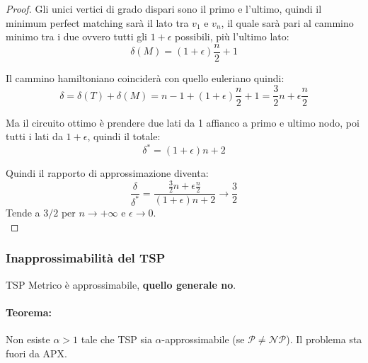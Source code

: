 \begin{proof}
	Gli unici vertici di grado dispari sono il primo e l'ultimo, quindi il minimum perfect matching sarà il lato tra $v_1$ e $v_n$, il quale sarà pari al cammino minimo tra i due ovvero tutti gli $1 + \epsilon$ possibili, più l'ultimo lato:
	$$ \delta(M) = (1 + \epsilon) \frac{n}{2} + 1$$
	
	Il cammino hamiltoniano coinciderà con quello euleriano quindi:
	$$ \delta = \delta (T) + \delta (M) = n-1 + (1 + \epsilon) \frac{n}{2} + 1 = \frac{3}{2} n + \epsilon \frac{n}{2} $$
	
	Ma il circuito ottimo è prendere due lati da 1 affianco a primo e ultimo nodo, poi tutti i lati da $1 + \epsilon$, quindi il totale: 
	$$ \delta^\ast = (1+ \epsilon)n + 2 $$
	
	Quindi il rapporto di approssimazione diventa: 
	$$ \frac{\delta}{\delta^\ast} = \frac{\frac{3}{2}n + \epsilon \frac{n}{2}}{ (1 + \epsilon) n + 2} \rightarrow \frac{3}{2}$$
	Tende a $3/2$ per $n \rightarrow +\infty$ e $\epsilon \rightarrow 0$.\\
\end{proof}

\newpage


\subsubsection{Inapprossimabilità del TSP}

TSP Metrico è approssimabile, \textbf{quello generale no}.\\

\paragraph{Teorema:} Non esiste $\alpha>1$ tale che TSP sia $\alpha$-approssimabile (se $\mathcal{P} \neq \mathcal{NP}$). Il problema sta fuori da APX.\\

